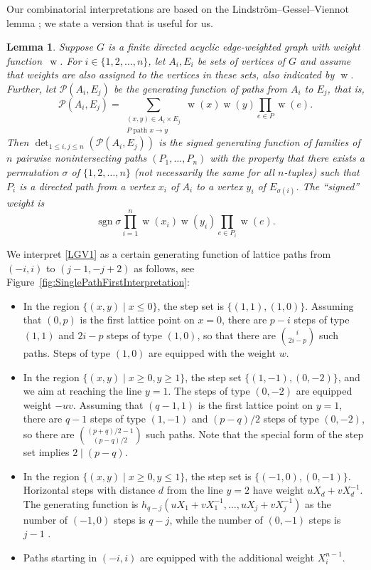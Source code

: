 \documentclass[12pt]{amsart}
\newtheorem{lemma}[theorem]{Lemma}
\theoremstyle{definition}
\numberwithin{equation}{section}
\DeclareMathOperator{\sgn}{sgn}
\newcommand{\W}{{\operatorname{w}}}
\begin{document}
Our combinatorial interpretations are based on the Lindstr\"om--Gessel--Viennot lemma \cite{Lin73,GesVie85,GesVie89}; we state a version that is useful for us. 

\begin{lemma} 
\label{LGV} 
Suppose $G$ is a finite directed acyclic edge-weighted graph with weight function~$\W$. For $i \in \{1,2,\ldots,n\}$, let $A_i, E_i$ be sets of vertices of $G$ and assume that weights are also assigned to the vertices in these sets, also indicated by $\W$. Further, let 
${\mathcal P}(A_i,E_j)$ be the generating function of paths from $A_i$ to $E_j$, that is,
\begin{equation*}
	{\mathcal P}(A_i,E_j) = \sum_{\substack{(x,y) \in A_i \times E_j\\\text{$P$ path $x \to y$}}} 
\W(x) \W(y) \prod_{\text{$e \in P$}} \W(e).
\end{equation*}
Then $\det_{1 \le i,j \le n} \left( {\mathcal P}(A_i,E_j) \right)$ is the signed generating function of families of $n$ pairwise nonintersecting paths $(P_1,\ldots,P_n)$ with the property that there exists a permutation $\sigma$ of $\{1,2,\ldots,\allowbreak n\}$ (not necessarily the same for all $n$-tuples) such that $P_i$ is a directed path from a vertex $x_i$ of $A_i$ to a vertex $y_i$ of $E_{\sigma(i)}$. The ``signed'' weight is 
\begin{equation*}
\sgn \sigma \prod_{i=1}^n \W(x_i) \W(y_i) \prod_{e \in P_i} \W(e). 
\end{equation*}
\end{lemma}  

We interpret \eqref{LGV1} as a certain generating function of lattice paths from $(-i,i)$ to 
$(j-1,-j+2)$ as follows, see Figure~\ref{fig:SinglePathFirstInterpretation}:

\begin{itemize}
\item In the region $\{(x,y) \mid x \le 0\}$, the step set is $\{(1,1),(1,0)\}$.
Assuming that $(0,p)$ is the first lattice point on $x=0$, there are $p-i$ steps of type  $(1,1)$ and $2i-p$ steps of type $(1,0)$, so that there are $\binom{i}{2i-p}$ such paths. Steps of type $(1,0)$ are equipped with the weight $w$. 
\item In the region $\{(x,y) \mid  x \ge 0, y \ge 1\}$, the step set $\{(1,-1),(0,-2)\}$, and we aim at reaching the line $y=1$. 
The steps of type $(0,-2)$ are equipped weight $-uv$. Assuming that $(q-1,1)$ is the first lattice point on $y=1$, there are $q-1$ steps of type $(1,-1)$ and $(p-q)/2$ steps of type $(0,-2)$, so there are $\binom{(p+q)/2-1}{(p-q)/2}$ such paths. Note that the special form of the step set implies $2 \mid (p-q)$.
\item 
In the region $\{(x,y) \mid  x \ge 0, y \le 1\}$, the step set is $\{(-1,0),(0,-1)\}$. Horizontal steps with distance $d$ from the line $y=2$ have weight $u X_d+v X_d^{-1}$. The generating function is 
$h_{q-j}(u X_1+ v X_1^{-1},\ldots,u X_j+ v X_j^{-1})$ as the number of $(-1,0)$ steps is $q-j$, while the number of $(0,-1)$ steps is $j-1$ . 
\item Paths starting in $(-i,i)$ are equipped with the additional weight $X_i^{n-1}$. 
\end{itemize} 
\end{document}
